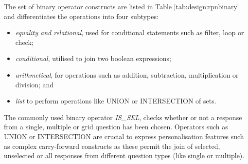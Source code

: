     The set of binary operator constructs are listed in Table \ref{tab:design:rpnbinary} and differentiates the operations into four subtypes:
    \begin{itemize}
        \item \emph{equality and relational}, used for conditional statements such as filter, loop or check;
        \item \emph{conditional}, utilised to join two boolean expressions;
        \item \emph{arithmetical}, for operations such as addition, subtraction, multiplication or division; and
        \item \emph{list} to perform operations like UNION or INTERSECTION of sets.
    \end{itemize}

    The commonly used binary operator \emph{IS\_SEL}, checks whether or not a response from a single, multiple or grid question has been chosen. Operators such as UNION or INTERSECTION are crucial to express personalisation features such as complex carry-forward constructs as these permit the join of selected, unselected or all responses from different question types (like single or multiple).

